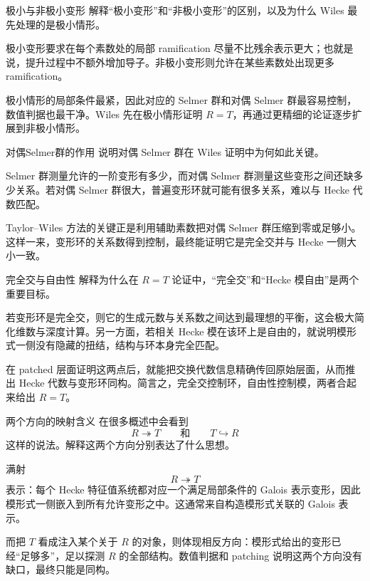 \begin{problem}{极小与非极小变形}
\hard
解释“极小变形”和“非极小变形”的区别，以及为什么 Wiles 最先处理的是极小情形。
\end{problem}
\begin{solution}
极小变形要求在每个素数处的局部 ramification 尽量不比残余表示更大；也就是说，提升过程中不额外增加导子。非极小变形则允许在某些素数处出现更多 ramification。

极小情形的局部条件最紧，因此对应的 Selmer 群和对偶 Selmer 群最容易控制，数值判据也最干净。Wiles 先在极小情形证明 $R=T$，再通过更精细的论证逐步扩展到非极小情形。
\end{solution}

\begin{problem}{对偶Selmer群的作用}
\hard
说明对偶 Selmer 群在 Wiles 证明中为何如此关键。
\end{problem}
\begin{solution}
Selmer 群测量允许的一阶变形有多少，而对偶 Selmer 群测量这些变形之间还缺多少关系。若对偶 Selmer 群很大，普遍变形环就可能有很多关系，难以与 Hecke 代数匹配。

Taylor--Wiles 方法的关键正是利用辅助素数把对偶 Selmer 群压缩到零或足够小。这样一来，变形环的关系数得到控制，最终能证明它是完全交并与 Hecke 一侧大小一致。
\end{solution}

\begin{problem}{完全交与自由性}
\hard
解释为什么在 $R=T$ 论证中，“完全交”和“Hecke 模自由”是两个重要目标。
\end{problem}
\begin{solution}
若变形环是完全交，则它的生成元数与关系数之间达到最理想的平衡，这会极大简化维数与深度计算。另一方面，若相关 Hecke 模在该环上是自由的，就说明模形式一侧没有隐藏的扭结，结构与环本身完全匹配。

在 patched 层面证明这两点后，就能把交换代数信息精确传回原始层面，从而推出 Hecke 代数与变形环同构。简言之，完全交控制环，自由性控制模，两者合起来给出 $R=T$。
\end{solution}

\begin{problem}{两个方向的映射含义}
\hard
在很多概述中会看到
\[
R\twoheadrightarrow T
\qquad\text{和}\qquad
T\hookrightarrow R
\]
这样的说法。解释这两个方向分别表达了什么思想。
\end{problem}
\begin{solution}
满射
\[
R\twoheadrightarrow T
\]
表示：每个 Hecke 特征值系统都对应一个满足局部条件的 Galois 表示变形，因此模形式一侧嵌入到所有允许变形之中。这通常来自构造模形式关联的 Galois 表示。

而把 $T$ 看成注入某个关于 $R$ 的对象，则体现相反方向：模形式给出的变形已经“足够多”，足以探测 $R$ 的全部结构。数值判据和 patching 说明这两个方向没有缺口，最终只能是同构。
\end{solution}

